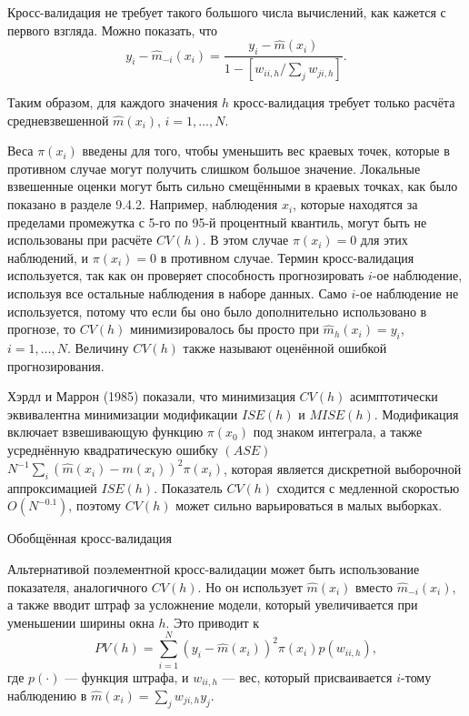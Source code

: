 Кросс-валидация не требует такого большого числа вычислений, как кажется с первого взгляда. Можно показать, что
\begin{equation}
y_i - \hat{m}_{-i}(x_i) = \frac{y_i - \hat{m}(x_i)}{1 - [w_{ii,h}/\sum_j w_{ji,h}]}.
\end{equation}

Таким образом, для каждого значения $h$ кросс-валидация требует только расчёта средневзвешенной $\hat{m}(x_i)$, $i = 1, \dots, N$.

Веса $\pi(x_i)$ введены для того, чтобы уменьшить вес краевых точек, которые в противном случае могут получить слишком большое значение. Локальные взвешенные оценки могут быть сильно смещёнными в краевых точках, как было показано в разделе 9.4.2. Например, наблюдения $x_i$, которые находятся за пределами промежутка с 5-го по 95-й процентный квантиль, могут быть не использованы при расчёте $CV(h)$. В этом случае $\pi(x_i) = 0$ для этих наблюдений, и $\pi(x_i) = 0$ в противном случае. Термин кросс-валидация используется, так как он проверяет способность прогнозировать $i$-ое наблюдение, используя все остальные наблюдения в наборе данных. Само $i$-ое наблюдение не используется, потому что если бы оно было дополнительно использовано в прогнозе, то $CV(h)$ минимизировалось бы просто при $\hat{m}_h(x_i) = y_i$, $i = 1, \dots, N$. Величину $CV(h)$ также называют оценённой ошибкой прогнозирования.

Хэрдл и Маррон (1985) показали, что минимизация $CV(h)$ асимптотически эквивалентна минимизации модификации $ISE(h)$ и $MISE(h)$. Модификация включает взвешивающую функцию $\pi(x_0)$ под знаком интеграла, а также усреднённую квадратическую ошибку $(ASE)$ $N^{-1}\sum_i (\hat{m}(x_i) - m(x_i))^2 \pi(x_i)$, которая является дискретной выборочной аппроксимацией $ISE(h)$. Показатель $CV(h)$ сходится с медленной скоростью $O(N^{-0.1})$, поэтому $CV(h)$ может сильно варьироваться в малых выборках.

\begin{center}
Обобщённая кросс-валидация
\end{center}

Альтернативой поэлементной кросс-валидации может быть использование показателя, аналогичного $CV(h)$. Но он использует $\hat{m}(x_i)$ вместо $\hat{m}_{-i}(x_i)$, а также вводит штраф за усложнение модели, который увеличивается при уменьшении ширины окна $h$. Это приводит к 
\[
PV(h) = \sum_{i=1}^N (y_i - \hat{m}(x_i))^2\pi(x_i)p(w_{ii,h}),
\]
где $p(\cdot)$ --- функция штрафа, и $w_{ii,h}$ --- вес, который присваивается $i$-тому наблюдению в $\hat{m}(x_i) = \sum_j w_{ji,h} y_j$.


